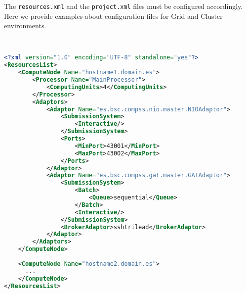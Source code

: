 The \texttt{resources.xml} and the \texttt{project.xml} files must be configured accordingly.
Here we provide examples about configuration files for Grid and Cluster environments.

~ \newline

\begin{lstlisting}[language=xml]
<?xml version="1.0" encoding="UTF-8" standalone="yes"?>                                                                                                                                                            
<ResourcesList>                                                                                                                                                                                                    
    <ComputeNode Name="hostname1.domain.es">                                                                                                                                                                       
        <Processor Name="MainProcessor">                                                                                                                                                                           
            <ComputingUnits>4</ComputingUnits>                                                                                                                                                                     
        </Processor>                                                                                                                                                                                               
        <Adaptors>                                                                                                                                                                                                 
            <Adaptor Name="es.bsc.compss.nio.master.NIOAdaptor">                                                                                                                                               
                <SubmissionSystem>
                    <Interactive/>
                </SubmissionSystem>
                <Ports>
                    <MinPort>43001</MinPort>
                    <MaxPort>43002</MaxPort>
                </Ports>
            </Adaptor>
            <Adaptor Name="es.bsc.compss.gat.master.GATAdaptor">
                <SubmissionSystem>
                    <Batch>
                        <Queue>sequential</Queue>
                    </Batch>
                    <Interactive/>
                </SubmissionSystem>
                <BrokerAdaptor>sshtrilead</BrokerAdaptor>
            </Adaptor>
        </Adaptors>
    </ComputeNode>
    
    <ComputeNode Name="hostname2.domain.es">
      ...
    </ComputeNode>
</ResourcesList>
\end{lstlisting}

